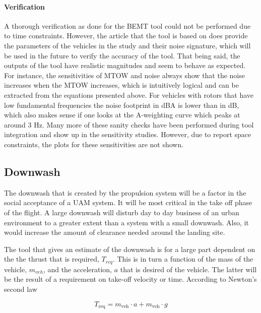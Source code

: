 \paragraph{Verification}

A thorough verification as done for the BEMT tool could not be performed due to time constraints. However, the article that the tool is based on does provide the parameters of the vehicles in the study and their noise signature, which will be used in the future to verify the accuracy of the tool. That being said, the outputs of the tool have realistic magnitudes and seem to behave as expected. For instance, the sensitivities of MTOW and noise always show that the noise increases when the MTOW increases, which is intuitively logical and can be extracted from the equations presented above. For vehicles with rotors that have low fundamental frequencies the noise footprint in dBA is lower than in dB, which also makes sense if one looks at the A-weighting curve which peaks at around 3 Hz. Many more of these sanity checks have been performed during tool integration and show up in the sensitivity studies. However, due to report space constraints, the plots for these sensitivities are not shown.













\subsection{Downwash}
The downwash that is created by the propulsion system will be a factor in the social acceptance of a UAM system. It will be most critical in the take off phase of the flight. A large downwash will disturb day to day business of an urban environment to a greater extent than a system with a small downwash. Also, it would increase the amount of clearance needed around the landing site. 

The tool that gives an estimate of the downwash is for a large part dependent on the the thrust that is required, $T_{req}$. This is in turn a function of the mass of the vehicle, $m_{veh}$, and the acceleration, $a$ that is desired of the vehicle. The latter will be the result of a requirement on take-off velocity or time. According to Newton's second law 

\begin{equation}
\label{downwasheq}
    T_\text{req} = m_\text{veh} \cdot a + m_\text{veh} \cdot g 
\end{equation}


